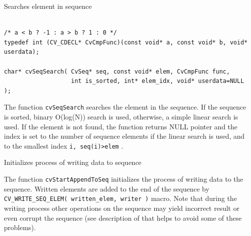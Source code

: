 \label{SeqSearch}

Searches element in sequence

\begin{lstlisting}

/* a < b ? -1 : a > b ? 1 : 0 */
typedef int (CV_CDECL* CvCmpFunc)(const void* a, const void* b, void* userdata);

char* cvSeqSearch( CvSeq* seq, const void* elem, CvCmpFunc func,
                   int is_sorted, int* elem_idx, void* userdata=NULL );

\end{lstlisting}

\begin{description}
\end{description}

The function \texttt{cvSeqSearch} searches the element in the sequence. If
the sequence is sorted, binary O(log(N)) search is used, otherwise, a
simple linear search is used. If the element is not found, the function
returns NULL pointer and the index is set to the number of sequence
elements if the linear search is used, and to the smallest index
\texttt{i, seq(i)>elem}
.

\label{StartAppendToSeq}

Initializes process of writing data to sequence


\begin{description}
\end{description}

The function \texttt{cvStartAppendToSeq} initializes the process of
writing data to the sequence. Written elements are added to the end of the
sequence by
\texttt{CV\_WRITE\_SEQ\_ELEM( written\_elem, writer )}
macro. Note
that during the writing process other operations on the sequence may
yield incorrect result or even corrupt the sequence (see description of
 that helps to avoid some of these problems).


